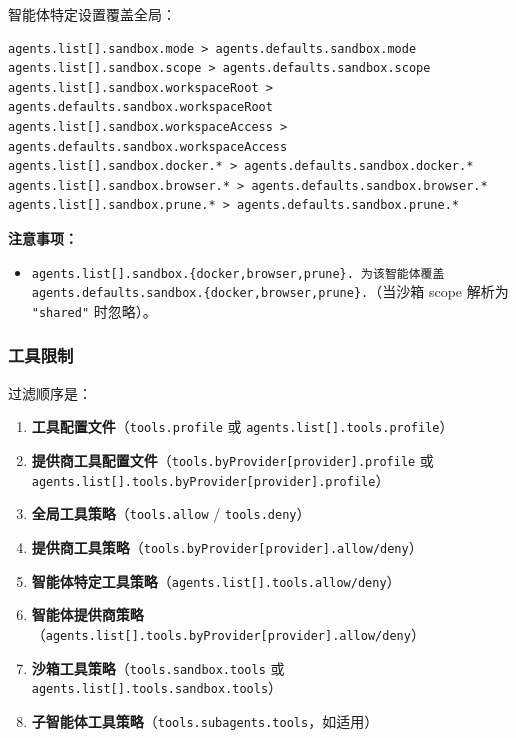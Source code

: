 智能体特定设置覆盖全局：

\begin{lstlisting}
agents.list[].sandbox.mode > agents.defaults.sandbox.mode
agents.list[].sandbox.scope > agents.defaults.sandbox.scope
agents.list[].sandbox.workspaceRoot > agents.defaults.sandbox.workspaceRoot
agents.list[].sandbox.workspaceAccess > agents.defaults.sandbox.workspaceAccess
agents.list[].sandbox.docker.* > agents.defaults.sandbox.docker.*
agents.list[].sandbox.browser.* > agents.defaults.sandbox.browser.*
agents.list[].sandbox.prune.* > agents.defaults.sandbox.prune.*
\end{lstlisting}


\textbf{注意事项：}

\begin{itemize}
  \item \texttt{agents.list[].sandbox.\{docker,browser,prune\}.\textit{} 为该智能体覆盖 \texttt{agents.defaults.sandbox.\{docker,browser,prune\}.}}（当沙箱 scope 解析为 \texttt{"shared"} 时忽略）。
\end{itemize}


\subsubsection{工具限制}


过滤顺序是：

\begin{enumerate}
  \item \textbf{工具配置文件}（\texttt{tools.profile} 或 \texttt{agents.list[].tools.profile}）
  \item \textbf{提供商工具配置文件}（\texttt{tools.byProvider[provider].profile} 或 \texttt{agents.list[].tools.byProvider[provider].profile}）
  \item \textbf{全局工具策略}（\texttt{tools.allow} / \texttt{tools.deny}）
  \item \textbf{提供商工具策略}（\texttt{tools.byProvider[provider].allow/deny}）
  \item \textbf{智能体特定工具策略}（\texttt{agents.list[].tools.allow/deny}）
  \item \textbf{智能体提供商策略}（\texttt{agents.list[].tools.byProvider[provider].allow/deny}）
  \item \textbf{沙箱工具策略}（\texttt{tools.sandbox.tools} 或 \texttt{agents.list[].tools.sandbox.tools}）
  \item \textbf{子智能体工具策略}（\texttt{tools.subagents.tools}，如适用）
\end{enumerate}


